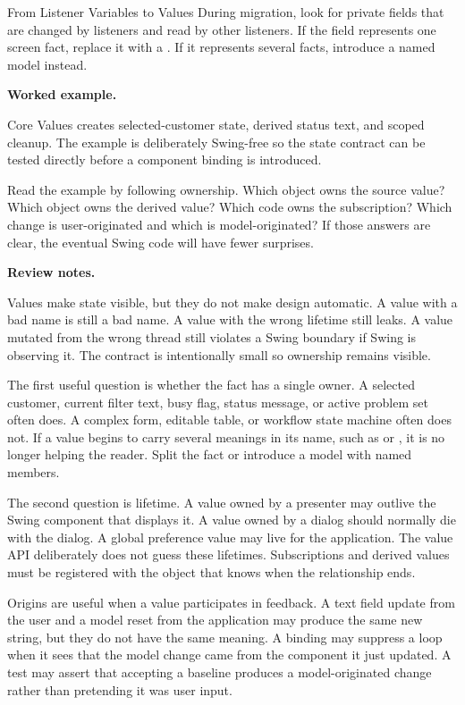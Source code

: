 \begin{migrationbox}{From Listener Variables to Values}
During migration, look for private fields that are changed by listeners and read
by other listeners. If the field represents one screen fact, replace it with a
. If it represents several facts, introduce a named model
instead.
\end{migrationbox}

\textbf{Worked example.}

\begin{examplebox}{Core Values}
\coreExample{} creates selected-customer state, derived status text, and scoped
cleanup. The example is deliberately Swing-free so the state contract can be
tested directly before a component binding is introduced.
\end{examplebox}

Read the example by following ownership. Which object owns the source value?
Which object owns the derived value? Which code owns the subscription? Which
change is user-originated and which is model-originated? If those answers are
clear, the eventual Swing code will have fewer surprises.

\textbf{Review notes.}

Values make state visible, but they do not make design automatic. A value with a
bad name is still a bad name. A value with the wrong lifetime still leaks. A
value mutated from the wrong thread still violates a Swing boundary if Swing is
observing it. The contract is intentionally small so ownership remains visible.

The first useful question is whether the fact has a single owner. A selected
customer, current filter text, busy flag, status message, or active problem set
often does. A complex form, editable table, or workflow state machine often
does not. If a value begins to carry several meanings in its name, such as
 or , it is no longer helping the reader. Split
the fact or introduce a model with named members.

The second question is lifetime. A value owned by a presenter may outlive the
Swing component that displays it. A value owned by a dialog should normally die
with the dialog. A global preference value may live for the application. The
value API deliberately does not guess these lifetimes. Subscriptions and
derived values must be registered with the object that knows when the
relationship ends.

Origins are useful when a value participates in feedback. A text field update
from the user and a model reset from the application may produce the same new
string, but they do not have the same meaning. A binding may suppress a loop
when it sees that the model change came from the component it just updated. A
test may assert that accepting a baseline produces a model-originated change
rather than pretending it was user input.

